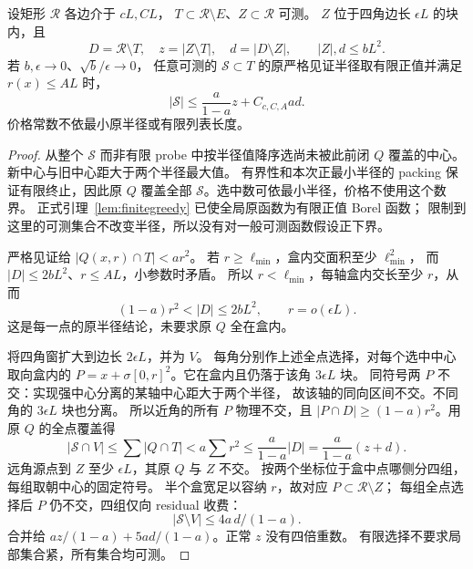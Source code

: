 \begin{lemma}[角窗中的精确局部费用]\label{eighth:exact-small-box}
设矩形 \(\mathcal R\) 各边介于 \(cL,CL\)，
\(T\subset\mathcal R\setminus E\)、\(Z\subset\mathcal R\) 可测。
\(Z\) 位于四角边长 \(\epsilon L\) 的块内，且
\[
 D=\mathcal R\setminus T,\quad z=|Z\setminus T|,\quad
 d=|D\setminus Z|,\qquad |Z|,d\le bL^2.
\]
若 \(b,\epsilon\to0\)、\(\sqrt b/\epsilon\to0\)，
任意可测的 \(\mathcal S\subset T\) 的原严格见证半径取有限正值并满足
\(r(x)\le AL\) 时，
\[
 |\mathcal S|\le\frac a{1-a}z+C_{c,C,A}ad.
\]
价格常数不依最小原半径或有限列表长度。
\end{lemma}
\begin{proof}
从整个 \(\mathcal S\) 而非有限 probe 中按半径值降序选尚未被此前闭
\(Q\) 覆盖的中心。新中心与旧中心距大于两个半径最大值。
有界性和本次正最小半径的 packing 保证有限终止，因此原 \(Q\)
覆盖全部 \(\mathcal S\)。选中数可依最小半径，价格不使用这个数界。
正式引理~\ref{lem:finitegreedy} 已使全局原函数为有限正值 Borel 函数；
限制到这里的可测集合不改变半径，所以没有对一般可测函数假设正下界。

严格见证给 \(|Q(x,r)\cap T|<ar^2\)。
若 \(r\ge\ell_{\min}\)，盒内交面积至少 \(\ell_{\min}^2\)，
而 \(|D|\le2bL^2\)、\(r\le AL\)，小参数时矛盾。
所以 \(r<\ell_{\min}\)，每轴盒内交长至少 \(r\)，从而
\[
 (1-a)r^2<|D|\le2bL^2,\qquad r=o(\epsilon L).
\]
这是每一点的原半径结论，未要求原 \(Q\) 全在盒内。

将四角窗扩大到边长 \(2\epsilon L\)，并为 \(V\)。
每角分别作上述全点选择，对每个选中中心取向盒内的
\(P=x+\sigma[0,r]^2\)。它在盒内且仍落于该角 \(3\epsilon L\) 块。
同符号两 \(P\) 不交：实现强中心分离的某轴中心距大于两个半径，
故该轴的同向区间不交。不同角的 \(3\epsilon L\) 块也分离。
所以近角的所有 \(P\) 物理不交，且
\(|P\cap D|\ge(1-a)r^2\)。用原 \(Q\) 的全点覆盖得
\[
 |\mathcal S\cap V|\le\sum|Q\cap T|<a\sum r^2
 \le\frac a{1-a}|D|=\frac a{1-a}(z+d).
\]
远角源点到 \(Z\) 至少 \(\epsilon L\)，其原 \(Q\) 与 \(Z\) 不交。
按两个坐标位于盒中点哪侧分四组，每组取朝中心的固定符号。
半个盒宽足以容纳 \(r\)，故对应 \(P\subset\mathcal R\setminus Z\)；
每组全点选择后 \(P\) 仍不交，四组仅向 residual 收费：
\[
 |\mathcal S\setminus V|\le4a\,d/(1-a).
\]
合并给 \(az/(1-a)+5ad/(1-a)\)。正常 \(z\) 没有四倍重数。
有限选择不要求局部集合紧，所有集合均可测。
\end{proof}

